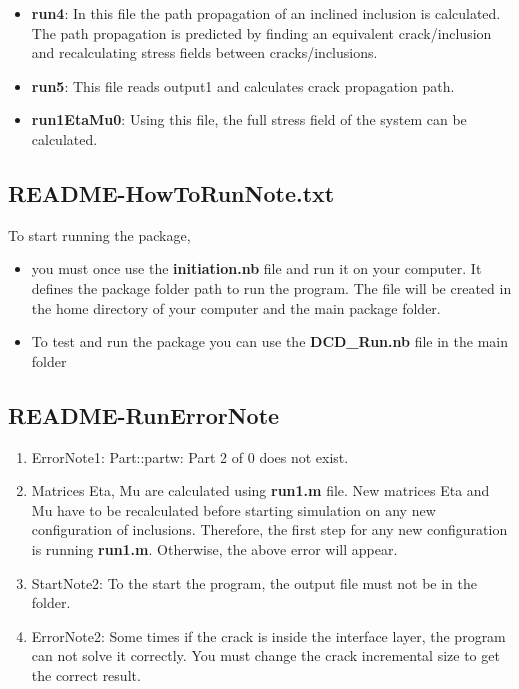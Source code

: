 \documentclass[12pt]{article}
\numberwithin{equation}{subsection}
\begin{document}
\begin{itemize}
\item  \textbf{run4}: 
In this file the path propagation of an inclined inclusion is calculated. The path propagation is predicted by finding an equivalent crack/inclusion and recalculating stress fields between cracks/inclusions. 

\item  \textbf{run5}: 
This file reads output1 and calculates crack propagation path.

\item  \textbf{run1EtaMu0}: 
Using this file, the full stress field of the system can be calculated. 

\end{itemize}


\clearpage
\subsection{README-HowToRunNote.txt}

To start running the package, 

\begin{itemize}

\item you must once use the \textbf{initiation.nb} file and run it on your computer. It defines the package folder path to run the program. The file will be created in the home directory of your computer and the main package folder.

\item To test and run the package you can use the \textbf{DCD\_Run.nb} file in the main folder

\end{itemize}

\clearpage
\subsection{README-RunErrorNote}
\begin{enumerate}
\item ErrorNote1: Part::partw: Part 2 of {{0}} does not exist. 

\item Matrices Eta, Mu are calculated using \textbf{run1.m} file. New matrices Eta and Mu have to be recalculated before starting simulation on any new configuration of inclusions. Therefore, the first step for any new configuration is running \textbf{run1.m}. Otherwise, the above error will appear. 


\item StartNote2: To the start the program, the output file must not be in the folder.  

\item ErrorNote2: Some times if the crack is inside the interface layer, the program can not solve it correctly. You must change the crack incremental size to get the correct result.


\end{enumerate}
\end{document}
